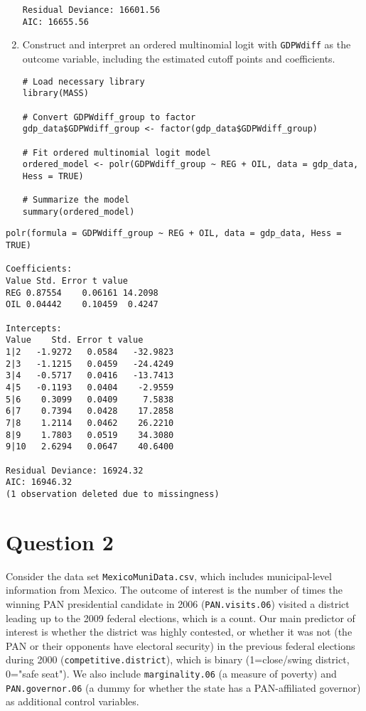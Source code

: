 \documentclass[12pt,letterpaper]{article}
\begin{document}
\begin{enumerate}
\begin{verbatim}
Residual Deviance: 16601.56 
AIC: 16655.56 

\end{verbatim}	

\newpage	
	\item Construct and interpret an ordered multinomial logit with \texttt{GDPWdiff} as the outcome variable, including the estimated cutoff points and coefficients.

\begin{lstlisting}		
# Load necessary library
library(MASS)

# Convert GDPWdiff_group to factor
gdp_data$GDPWdiff_group <- factor(gdp_data$GDPWdiff_group)

# Fit ordered multinomial logit model
ordered_model <- polr(GDPWdiff_group ~ REG + OIL, data = gdp_data, Hess = TRUE)

# Summarize the model
summary(ordered_model)
\end{lstlisting}
	
\end{enumerate}

\begin{verbatim}
polr(formula = GDPWdiff_group ~ REG + OIL, data = gdp_data, Hess = TRUE)

Coefficients:
Value Std. Error t value
REG 0.87554    0.06161 14.2098
OIL 0.04442    0.10459  0.4247

Intercepts:
Value    Std. Error t value 
1|2   -1.9272   0.0584   -32.9823
2|3   -1.1215   0.0459   -24.4249
3|4   -0.5717   0.0416   -13.7413
4|5   -0.1193   0.0404    -2.9559
5|6    0.3099   0.0409     7.5838
6|7    0.7394   0.0428    17.2858
7|8    1.2114   0.0462    26.2210
8|9    1.7803   0.0519    34.3080
9|10   2.6294   0.0647    40.6400

Residual Deviance: 16924.32 
AIC: 16946.32 
(1 observation deleted due to missingness)

\end{verbatim}




\newpage	
\section*{Question 2} 
\vspace{.25cm}

\noindent Consider the data set \texttt{MexicoMuniData.csv}, which includes municipal-level information from Mexico. The outcome of interest is the number of times the winning PAN presidential candidate in 2006 (\texttt{PAN.visits.06}) visited a district leading up to the 2009 federal elections, which is a count. Our main predictor of interest is whether the district was highly contested, or whether it was not (the PAN or their opponents have electoral security) in the previous federal elections during 2000 (\texttt{competitive.district}), which is binary (1=close/swing district, 0="safe seat"). We also include \texttt{marginality.06} (a measure of poverty) and \texttt{PAN.governor.06} (a dummy for whether the state has a PAN-affiliated governor) as additional control variables. 
\end{document}
